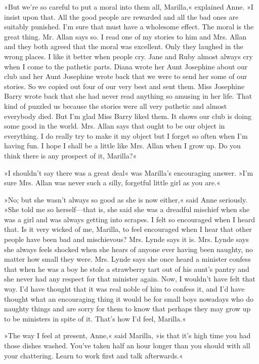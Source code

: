 »But we’re so careful to put a moral into them all, Marilla,« explained Anne. »I insist upon that. All the good people are rewarded and all the bad ones are suitably punished. I’m sure that must have a wholesome effect. The moral is the great thing. Mr. Allan says so. I read one of my stories to him and Mrs. Allan and they both agreed that the moral was excellent. Only they laughed in the wrong places. I like it better when people cry. Jane and Ruby almost always cry when I come to the pathetic parts. Diana wrote her Aunt Josephine about our club and her Aunt Josephine wrote back that we were to send her some of our stories. So we copied out four of our very best and sent them. Miss Josephine Barry wrote back that she had never read anything so amusing in her life. That kind of puzzled us because the stories were all very pathetic and almost everybody died. But I’m glad Miss Barry liked them. It shows our club is doing some good in the world. Mrs. Allan says that ought to be our object in everything. I do really try to make it my object but I forget so often when I’m having fun. I hope I shall be a little like Mrs. Allan when I grow up. Do you think there is any prospect of it, Marilla?«

»I shouldn’t say there was a great deal« was Marilla’s encouraging answer. »I’m sure Mrs. Allan was never such a silly, forgetful little girl as you are.«

»No; but she wasn’t always so good as she is now either,« said Anne seriously. »She told me so herself—that is, she said she was a dreadful mischief when she was a girl and was always getting into scrapes. I felt so encouraged when I heard that. Is it very wicked of me, Marilla, to feel encouraged when I hear that other people have been bad and mischievous? Mrs. Lynde says it is. Mrs. Lynde says she always feels shocked when she hears of anyone ever having been naughty, no matter how small they were. Mrs. Lynde says she once heard a minister confess that when he was a boy he stole a strawberry tart out of his aunt’s pantry and she never had any respect for that minister again. Now, I wouldn’t have felt that way. I’d have thought that it was real noble of him to confess it, and I’d have thought what an encouraging thing it would be for small boys nowadays who do naughty things and are sorry for them to know that perhaps they may grow up to be ministers in spite of it. That’s how I’d feel, Marilla.«

»The way I feel at present, Anne,« said Marilla, »is that it’s high time you had those dishes washed. You’ve taken half an hour longer than you should with all your chattering. Learn to work first and talk afterwards.«